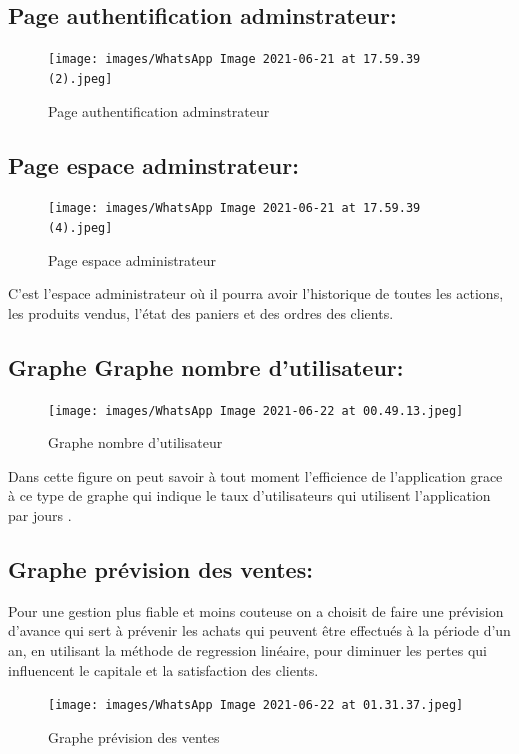 \documentclass[a4paper]{report}
\begin{document}
\begin{doublespace}
\begin{doublespace}
\begin{doublespace}
\begin{doublespace}
\begin{doublespace}
\begin{doublespace}
\subsection{Page authentification adminstrateur:}
\begin{figure}[H]
\begin{center}
 \texttt{[image: images/WhatsApp Image 2021-06-21 at 17.59.39 (2).jpeg]}
 \caption{Page authentification adminstrateur}
 \end{center}
\end{figure}
\subsection{Page espace adminstrateur:}
\begin{figure}[H]
\begin{center}
 \texttt{[image: images/WhatsApp Image 2021-06-21 at 17.59.39 (4).jpeg]}
 \caption{Page espace administrateur}
 \end{center}
\end{figure}
C'est l'espace administrateur où il pourra avoir l'historique de toutes les actions, les produits vendus, l'état des paniers et des ordres des clients. 
\subsection{Graphe Graphe nombre d'utilisateur:}

\begin{figure}[H]
\begin{center}
 \texttt{[image: images/WhatsApp Image 2021-06-22 at 00.49.13.jpeg]}
 \caption{Graphe nombre d'utilisateur}
 \end{center}
 \end{figure}
Dans cette figure on peut savoir à tout moment l'efficience de l'application grace à ce type de graphe qui indique le taux d'utilisateurs qui utilisent l'application par jours .
 \subsection{Graphe prévision des ventes:}
Pour une gestion plus fiable et moins couteuse on a choisit de faire une prévision d'avance qui sert à prévenir les achats qui peuvent être effectués à la période d'un an, en utilisant la méthode de regression linéaire, pour diminuer les pertes qui influencent le capitale et la satisfaction des clients.
\begin{figure}[H]
\begin{center}
 \texttt{[image: images/WhatsApp Image 2021-06-22 at 01.31.37.jpeg]}
 \caption{Graphe prévision des ventes}
 \end{center}
 \end{figure}

\end{doublespace}
\end{doublespace}
\end{doublespace}
\end{doublespace}
\end{doublespace}
\end{doublespace}
\end{document}
